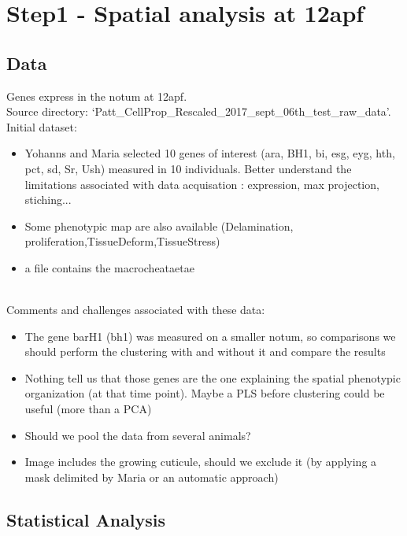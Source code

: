 \documentclass[]{article}
\begin{document}
\section{Step1 - Spatial analysis at 12apf}

\subsection{Data}
Genes express in the notum at 12apf.\\
\newline
Source directory: `Patt\_CellProp\_Rescaled\_2017\_sept\_06th\_test\_raw\_data'.\\
\newline
Initial dataset:
\begin{itemize} 
\item Yohanns and Maria selected 10 genes of interest (ara, BH1, bi, esg, eyg, hth, pct, sd, Sr, Ush) measured in 10 individuals. {\color{blue} Better understand the limitations associated with data acquisation : expression, max projection, stiching...}
\item Some phenotypic map are also available (Delamination, proliferation,TissueDeform,TissueStress)
\item a file contains the macrocheataetae
\end{itemize}\\
Comments and challenges associated with these data:
\begin{itemize}
	\item The gene barH1 (bh1) was measured on a smaller notum, so comparisons we should perform the clustering with and without it and compare the results
	\item Nothing tell us that those genes are the one explaining the spatial phenotypic organization (at that time point). Maybe a PLS before clustering could be useful (more than a PCA)
	\item Should we pool the data from several animals?
	\item Image includes the growing cuticule, should we exclude it (by applying a mask delimited by Maria or an automatic approach) 	 
\end{itemize}
\subsection{Statistical Analysis}
\end{document}
